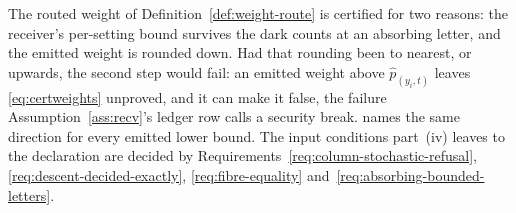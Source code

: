 
The routed weight of Definition~\ref{def:weight-route} is certified for two
reasons: the receiver's per-setting bound survives the dark counts at an
absorbing letter, and the emitted weight is rounded down. Had that rounding
been to nearest, or upwards, the second step would fail: an emitted weight
above $\hat p_{(y_i,t)}$ leaves \eqref{eq:certweights} unproved, and it can
make it false, the failure Assumption~\ref{ass:recv}'s ledger row calls a
security break.
 names the same direction for every
emitted lower bound. The input conditions part~(iv) leaves to the declaration
are decided by Requirements~\ref{req:column-stochastic-refusal},
\ref{req:descent-decided-exactly}, \ref{req:fibre-equality}
and~\ref{req:absorbing-bounded-letters}.

